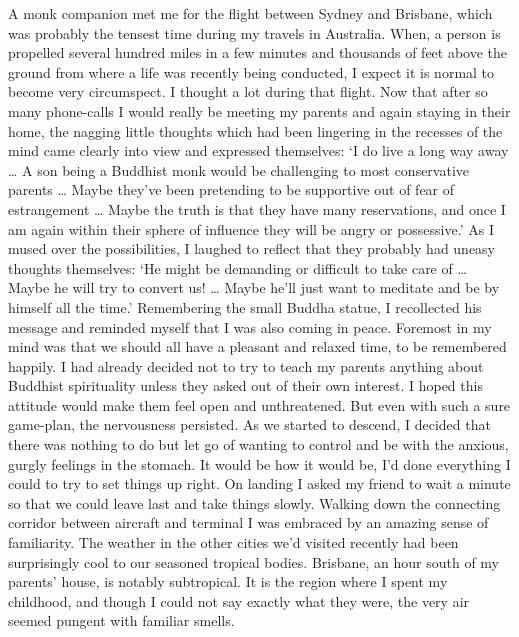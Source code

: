 A monk companion met me for the flight between Sydney and Brisbane, which
was probably the tensest time during my travels in Australia. When, a
person is propelled several hundred miles in a few minutes and thousands
of feet above the ground from where a life was recently being conducted, 
I expect it is normal to become very circumspect. I thought a lot during
that flight. Now that after so many phone-calls I would really be
meeting my parents and again staying in their home, the nagging little
thoughts which had been lingering in the recesses of the mind came
clearly into view and expressed themselves: `I do live a long way away
\ldots{} A son being a Buddhist monk would be challenging to most
conservative parents \ldots{} Maybe they've been pretending to be
supportive out of fear of estrangement \ldots{} Maybe the truth is that
they have many reservations, and once I am again within their sphere of
influence they will be angry or possessive.' As I mused over the
possibilities, I laughed to reflect that they probably had uneasy
thoughts themselves: `He might be demanding or difficult to take care of
\ldots{} Maybe he will try to convert us! \ldots{} Maybe he'll just want
to meditate and be by himself all the time.' Remembering the small
Buddha statue, I recollected his message and reminded myself that I was
also coming in peace. Foremost in my mind was that we should all have a
pleasant and relaxed time, to be remembered happily. I had already
decided not to try to teach my parents anything about Buddhist
spirituality unless they asked out of their own interest. I hoped this
attitude would make them feel open and unthreatened. But even with such
a sure game-plan, the nervousness persisted. As we started to descend, I
decided that there was nothing to do but let go of wanting to control
and be with the anxious, gurgly feelings in the stomach. It would be how
it would be, I'd done everything I could to try to set things up right. 
On landing I asked my friend to wait a minute so that we could leave
last and take things slowly. Walking down the connecting corridor
between aircraft and terminal I was embraced by an amazing sense of
familiarity. The weather in the other cities we'd visited recently had
been surprisingly cool to our seasoned tropical bodies. Brisbane, an
hour south of my parents' house, is notably subtropical. It is the
region where I spent my childhood, and though I could not say exactly
what they were, the very air seemed pungent with familiar smells. 


